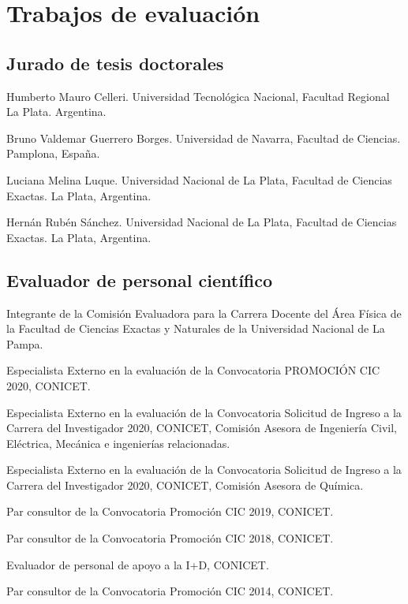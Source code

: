 \section{Trabajos de evaluación}

\subsection{Jurado de tesis doctorales}

 Humberto Mauro Celleri. Universidad Tecnológica Nacional, Facultad Regional La Plata. Argentina.

 Bruno Valdemar Guerrero Borges. Universidad de Navarra, Facultad de Ciencias. Pamplona, España.

 Luciana Melina Luque. Universidad Nacional de La Plata, Facultad de Ciencias Exactas. La Plata, Argentina.

 Hernán Rubén Sánchez. Universidad Nacional de La Plata, Facultad de Ciencias Exactas. La Plata, Argentina.



\subsection{Evaluador de personal científico}

 Integrante de la Comisión Evaluadora para la Carrera Docente del Área Física de la Facultad de Ciencias Exactas y Naturales de la Universidad Nacional de La Pampa.

Especialista Externo en la evaluación de la Convocatoria PROMOCIÓN CIC 2020, CONICET.

 Especialista Externo en la evaluación de la Convocatoria Solicitud de Ingreso a la Carrera del Investigador 2020, CONICET,
 Comisión Asesora de Ingeniería Civil, Eléctrica, Mecánica e ingenierías relacionadas.

Especialista Externo en la evaluación de la Convocatoria Solicitud de Ingreso a la Carrera del Investigador 2020, CONICET, 
Comisión Asesora de Química.

 Par consultor de la Convocatoria Promoción CIC 2019, CONICET.

 Par consultor de la Convocatoria Promoción CIC 2018, CONICET.

 Evaluador de personal de apoyo a la I+D, CONICET.

 Par consultor de la Convocatoria Promoción CIC 2014, CONICET.



